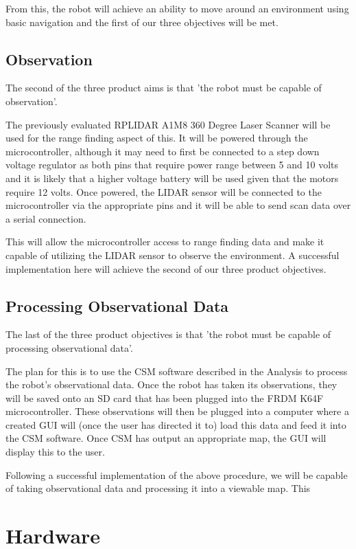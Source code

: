 			From this, the robot will achieve an ability to move around an environment using basic navigation and the first of our three objectives will be met.
			
		\subsection{Observation}
		The second of the three product aims is that 'the robot must be capable of observation'.
			
		The previously evaluated RPLIDAR A1M8 360 Degree Laser Scanner will be used for the range finding aspect of this. It will be powered through the microcontroller, although it may need to first be connected to a step down voltage regulator as both pins that require power range between 5 and 10 volts and it is likely that a higher voltage battery will be used given that the motors require 12 volts. Once powered, the LIDAR sensor will be connected to the microcontroller via the appropriate pins and it will be able to send scan data over a serial connection.
			
		This will allow the microcontroller access to range finding data and make it capable of utilizing the LIDAR sensor to observe the environment. A successful implementation here will achieve the second of our three product objectives.
			
		\subsection{Processing Observational Data}
		The last of the three product objectives is that 'the robot must be capable of processing observational data'.
		
		The plan for this is to use the CSM software described in the Analysis to process the robot's observational data. Once the robot has taken its observations, they will be saved onto an SD card that has been plugged into the FRDM K64F microcontroller. These observations will then be plugged into a computer where a created GUI will (once the user has directed it to) load this data and feed it into the CSM software. Once CSM has output an appropriate map, the GUI will display this to the user.
		
		Following a successful implementation of the above procedure, we will be capable of taking observational data and processing it into a viewable map. This
	
	\section{Hardware}
